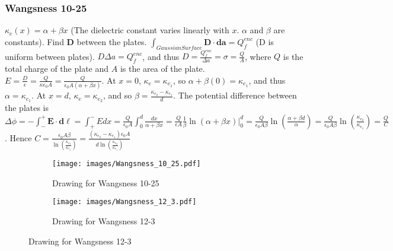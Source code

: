            \subsubsection{Wangsness 10-25}
            $\kappa_e(x) = \alpha+\beta x$ (The dielectric constant varies linearly with $x$. $\alpha$ and $\beta$ are constants). Find $\mathbf{D}$ between the plates. $\int_{Gaussian Surface} \mathbf{D}\cdot \mathbf{da} = Q_f^{enc}$ (D is uniform between plates). $D\Delta a = Q_f^{enc}$, and thus $D = \frac{Q_f^{enc}}{\Delta a} = \sigma = \frac{Q}{A}$, where $Q$ is the total charge of the plate and $A$ is the area of the plate. $E = \frac{D}{\epsilon} = \frac{Q}{\kappa \epsilon_0 A} = \frac{Q}{\epsilon_0 A(\alpha + \beta x)}$. At $x=0$, $\kappa_e = \kappa_{e_1}$, so $\alpha+\beta(0) = \kappa_{e_1}$, and thus $\alpha = \kappa_{e_1}$. At $x=d$, $\kappa_{e} = \kappa_{e_2}$, and so $\beta = \frac{\kappa_{e_2}-\kappa_{e_1}}{d}$. The potential difference between the plates is $\Delta \phi = -\int_{-}^{+} \mathbf{E}\cdot \mathbf{d\ell} = \int_{+}^{-} Edx = \frac{Q}{\epsilon_0 A} \int_{0}^{d} \frac{dx}{\alpha+\beta x} = \frac{Q}{\epsilon A} \frac{1}{\beta} \ln(\alpha+\beta x)\big|_{0}^{d} = \frac{Q}{\epsilon_0 A\beta} \ln(\frac{\alpha+\beta d}{\alpha}) = \frac{Q}{\epsilon_0 A\beta} \ln(\frac{\kappa_{e_2}}{\kappa_{e_1}}) = \frac{Q}{C}$. Hence $C = \frac{\epsilon_0 A\beta}{\ln(\frac{\kappa_{e_2}}{\kappa_{e_1}})} = \frac{(\kappa_{e_2}-\kappa_{e_1})\epsilon_0 A}{d\ln(\frac{\kappa_{e_2}}{\kappa_{e_1}})}$
            \begin{figure}[H]
                \centering
                \captionsetup{type=figure}
                \begin{subfigure}[b]{0.49\textwidth}
                    \centering
                    \captionsetup{type=figure}
                    \texttt{[image: images/Wangsness\_10\_25.pdf]}
                    \caption{Drawing for Wangsness 10-25}
                \end{subfigure}
                \begin{subfigure}[b]{0.49\textwidth}
                    \centering
                    \captionsetup{type=figure}
                    \texttt{[image: images/Wangsness\_12\_3.pdf]}
                    \caption{Drawing for Wangsness 12-3}
              \end{subfigure}
            \end{figure}
